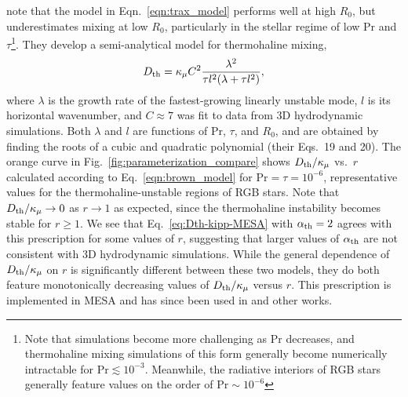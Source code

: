 \citet{brown_etal_2013} note that the model in Eqn.~\eqref{eqn:trax_model} performs well at high $R_0$, but underestimates mixing at low $R_0$, particularly in the stellar regime of low Pr and $\tau$\footnote{Note that simulations become more challenging as $\mathrm{Pr}$ decreases, and thermohaline mixing simulations of this form generally become numerically intractable for $\mathrm{Pr} \lesssim 10^{-3}$. Meanwhile, the radiative interiors of RGB stars generally feature values on the order of $\mathrm{Pr} \sim 10^{-6}$}.
They develop a semi-analytical model for thermohaline mixing,
\begin{equation}
    \Dth = \kappa_{\mu}C^2\frac{\lambda^2}{\tau l^2(\lambda + \tau l^2)},
    \label{eqn:brown_model}
\end{equation}
where $\lambda$ is the growth rate of the fastest-growing linearly unstable mode, $l$ is its horizontal wavenumber, and $C \approx 7$ was fit to data from 3D hydrodynamic simulations.
Both $\lambda$ and $l$ are functions of $\mathrm{Pr}$, $\tau$, and $R_0$, and are obtained by finding the roots of a cubic and quadratic polynomial (their Eqs.~19 and 20).
The orange curve in Fig.~\ref{fig:parameterization_compare} shows $D_\mathrm{th}/\kappa_\mu$ vs.~$r$ calculated according to Eq.~\eqref{eqn:brown_model} for $\mathrm{Pr} = \tau = 10^{-6}$, representative values for the thermohaline-unstable regions of RGB stars. 
Note that $D_\mathrm{th}/\kappa_\mu \to 0$ as $r \to 1$ as expected, since the thermohaline instability becomes stable for $r \geq 1$.
We see that Eq.~\eqref{eq:Dth-kipp-MESA} with $\alpha_{\rm{th}} = 2$ agrees with this prescription for some values of $r$, suggesting that larger values of $\alpha_{\rm{th}}$ are not consistent with 3D hydrodynamic simulations. 
While the general dependence of $D_\mathrm{th}/\kappa_\mu$ on $r$ is significantly different between these two models, they do both feature monotonically decreasing values of $D_\mathrm{th}/\kappa_\mu$ versus $r$. 
This prescription is implemented in MESA and has since been used in \citep{bauer_bildsten_2019} and other works. %

